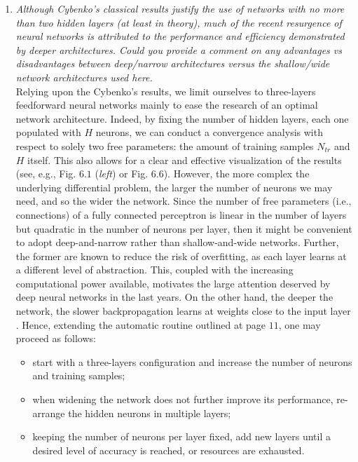 \documentclass[longtitle]{elsarticle}
\theoremstyle{theorem}
\theoremstyle{definition}
\theoremstyle{remark}
\theoremstyle{proposition}
\numberwithin{figure}{section}
\begin{document}
\begin{enumerate}
			\item \emph{Although Cybenko's classical results justify the use of networks with no more than two hidden layers (at least in theory), much of the recent resurgence of neural networks is attributed to the performance and efficiency demonstrated by deeper architectures. Could you provide a comment on any advantages vs disadvantages between deep/narrow architectures versus the shallow/wide network architectures used here.} \\[0.3cm]
			Relying upon the Cybenko's results, we limit ourselves to three-layers feedforward neural networks mainly to ease the research of an optimal network architecture. Indeed, by fixing the number of hidden layers, each one populated with $H$ neurons, we can conduct a convergence analysis with respect to solely two free parameters: the amount of training samples $N_{tr}$ and $H$ itself. This also allows for a clear and effective visualization of the results (see, e.g., Fig. $6.1$ (\emph{left}) or Fig. $6.6$). However, the more complex the underlying differential problem, the larger the number of neurons we may need, and so the wider the network. Since the number of free parameters (i.e., connections) of a fully connected perceptron is linear in the number of layers but quadratic in the number of neurons per layer, then it might be convenient to adopt deep-and-narrow rather than shallow-and-wide networks. Further, the former are known to reduce the risk of overfitting, as each layer learns at a different level of abstraction. This, coupled with the increasing computational power available, motivates the large attention deserved by deep neural networks in the last years. On the other hand, the deeper the network, the slower backpropagation learns at weights close to the input layer \cite{Kri07}. Hence, extending the automatic routine outlined at page $11$, one may proceed as follows:
			\begin{itemize}
				\item start with a three-layers configuration and increase the number of neurons and training samples; 
				\item when widening the network does not further improve its performance, re-arrange the hidden neurons in multiple layers;
				\item keeping the number of neurons per layer fixed, add new layers until a desired level of accuracy is reached, or resources are exhausted.
			\end{itemize}


\end{enumerate}
\end{document}
